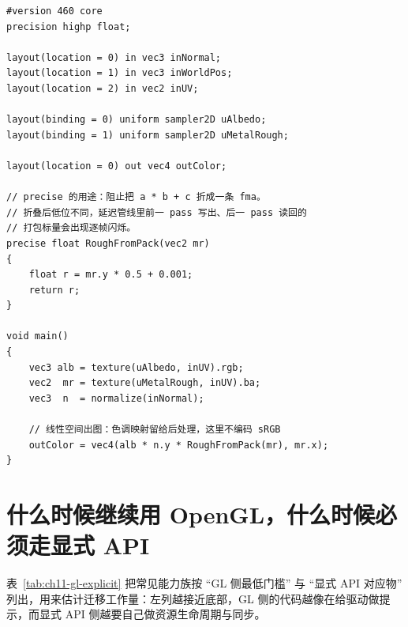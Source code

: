 \documentclass[12pt,a4paper,fontset=fandol]{ctexbook}
\begin{document}
\begin{lstlisting}[style=glslstyle,caption={core profile 片元着色器：precise 阻止 fma 折叠，保证 g-buffer 与光照 pass 的低位一致},label={lst:ch11-core-frag}]
#version 460 core
precision highp float;

layout(location = 0) in vec3 inNormal;
layout(location = 1) in vec3 inWorldPos;
layout(location = 2) in vec2 inUV;

layout(binding = 0) uniform sampler2D uAlbedo;
layout(binding = 1) uniform sampler2D uMetalRough;

layout(location = 0) out vec4 outColor;

// precise 的用途：阻止把 a * b + c 折成一条 fma。
// 折叠后低位不同，延迟管线里前一 pass 写出、后一 pass 读回的
// 打包标量会出现逐帧闪烁。
precise float RoughFromPack(vec2 mr)
{
    float r = mr.y * 0.5 + 0.001;
    return r;
}

void main()
{
    vec3 alb = texture(uAlbedo, inUV).rgb;
    vec2  mr = texture(uMetalRough, inUV).ba;
    vec3  n  = normalize(inNormal);

    // 线性空间出图：色调映射留给后处理，这里不编码 sRGB
    outColor = vec4(alb * n.y * RoughFromPack(mr), mr.x);
}
\end{lstlisting}

\section{什么时候继续用 OpenGL，什么时候必须走显式 API}

表~\ref{tab:ch11-gl-explicit} 把常见能力族按 ``GL 侧最低门槛'' 与 ``显式 API 对应物''
列出，用来估计迁移工作量：左列越接近底部，GL 侧的代码越像在给驱动做提示，而显式
API 侧越要自己做资源生命周期与同步。
\end{document}
